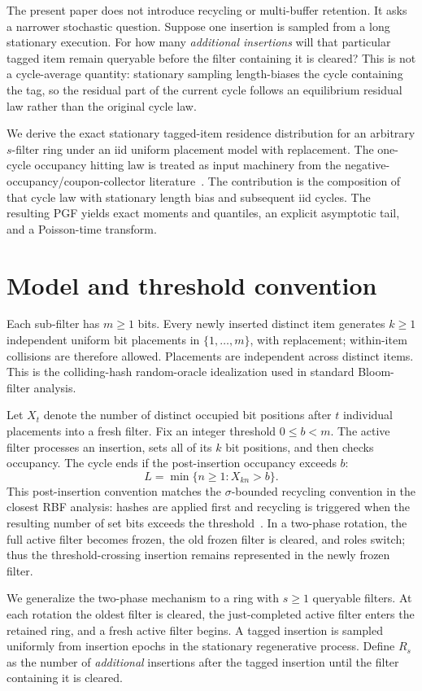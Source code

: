 \documentclass[11pt]{article}
\begin{document}
The present paper does not introduce recycling or multi-buffer retention. It asks a narrower stochastic question. Suppose one insertion is sampled from a long stationary execution. For how many \emph{additional insertions} will that particular tagged item remain queryable before the filter containing it is cleared? This is not a cycle-average quantity: stationary sampling length-biases the cycle containing the tag, so the residual part of the current cycle follows an equilibrium residual law rather than the original cycle law.

We derive the exact stationary tagged-item residence distribution for an arbitrary $s$-filter ring under an iid uniform placement model with replacement. The one-cycle occupancy hitting law is treated as input machinery from the negative-occupancy/coupon-collector literature~\cite{oneill2022}. The contribution is the composition of that cycle law with stationary length bias and subsequent iid cycles. The resulting PGF yields exact moments and quantiles, an explicit asymptotic tail, and a Poisson-time transform.

\section{Model and threshold convention}
Each sub-filter has $m\ge1$ bits. Every newly inserted distinct item generates $k\ge1$ independent uniform bit placements in $\{1,\ldots,m\}$, with replacement; within-item collisions are therefore allowed. Placements are independent across distinct items. This is the colliding-hash random-oracle idealization used in standard Bloom-filter analysis.

Let $X_t$ denote the number of distinct occupied bit positions after $t$ individual placements into a fresh filter. Fix an integer threshold $0\le b<m$. The active filter processes an insertion, sets all of its $k$ bit positions, and then checks occupancy. The cycle ends if the post-insertion occupancy exceeds $b$:
\[
L=\min\{n\ge1:X_{kn}>b\}.
\]
This post-insertion convention matches the $\sigma$-bounded recycling convention in the closest RBF analysis: hashes are applied first and recycling is triggered when the resulting number of set bits exceeds the threshold~\cite{dozierfp2024}. In a two-phase rotation, the full active filter becomes frozen, the old frozen filter is cleared, and roles switch; thus the threshold-crossing insertion remains represented in the newly frozen filter.

We generalize the two-phase mechanism to a ring with $s\ge1$ queryable filters. At each rotation the oldest filter is cleared, the just-completed active filter enters the retained ring, and a fresh active filter begins. A tagged insertion is sampled uniformly from insertion epochs in the stationary regenerative process. Define $R_s$ as the number of \emph{additional} insertions after the tagged insertion until the filter containing it is cleared.
\end{document}
